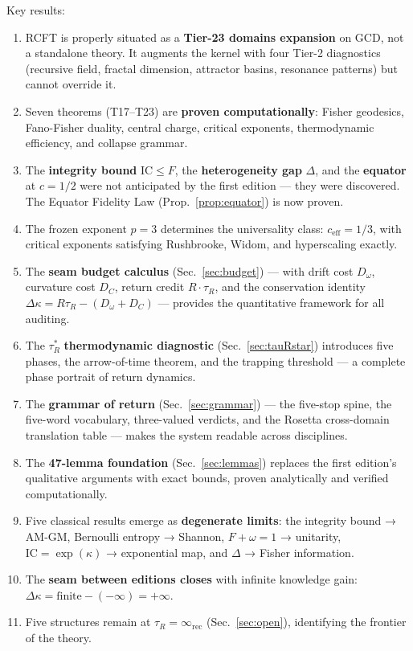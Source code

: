 \documentclass[
  aps,
  prd,
  preprint,
  superscriptaddress,
  nofootinbib,
  floatfix,
  longbibliography
]{revtex4-2}
\newcommand{\tR}{\tau_{\!R}}
\newcommand{\tRstar}{\tau_{\!R}^{*}}
\newcommand{\IC}{\mathrm{IC}}
\newcommand{\Fid}{F}
\newcommand{\Drft}{\omega}
\newcommand{\Curv}{C}
\newcommand{\Logint}{\kappa}
\newcommand{\ceff}{c_{\mathrm{eff}}}
\newcommand{\hetgap}{\Delta}
\begin{document}
Key results:
\begin{enumerate}[nosep,leftmargin=*]
  \item RCFT is properly situated as a \textbf{Tier-23 domains
    expansion} on GCD, not a standalone theory. It augments
    the kernel with four Tier-2 diagnostics
    (recursive field, fractal dimension, attractor basins,
    resonance patterns) but cannot override it.
  \item Seven theorems (T17–T23) are \textbf{proven
    computationally}: Fisher geodesics, Fano-Fisher duality,
    central charge, critical exponents, thermodynamic
    efficiency, and collapse grammar.
  \item The \textbf{integrity bound} $\IC \leq \Fid$, the
    \textbf{heterogeneity gap} $\hetgap$, and the
    \textbf{equator} at $c = 1/2$ were not anticipated
    by the first edition — they were discovered.
    The Equator Fidelity Law (Prop.~\ref{prop:equator})
    is now proven.
  \item The frozen exponent $p = 3$ determines the universality
    class: $\ceff = 1/3$, with critical exponents satisfying
    Rushbrooke, Widom, and hyperscaling exactly.
  \item The \textbf{seam budget calculus}
    (Sec.~\ref{sec:budget}) — with drift cost $D_\Drft$,
    curvature cost $D_\Curv$, return credit $R \cdot \tR$,
    and the conservation identity
    $\Delta\Logint = R\tR - (D_\Drft + D_\Curv)$ —
    provides the quantitative framework for all auditing.
  \item The $\tRstar$ \textbf{thermodynamic diagnostic}
    (Sec.~\ref{sec:tauRstar}) introduces five phases, the
    arrow-of-time theorem, and the trapping threshold
    — a complete phase portrait of return dynamics.
  \item The \textbf{grammar of return}
    (Sec.~\ref{sec:grammar}) — the five-stop spine,
    the five-word vocabulary, three-valued verdicts,
    and the Rosetta cross-domain translation table —
    makes the system readable across disciplines.
  \item The \textbf{47-lemma foundation}
    (Sec.~\ref{sec:lemmas}) replaces the first edition's
    qualitative arguments with exact bounds, proven
    analytically and verified computationally.
  \item Five classical results emerge as \textbf{degenerate
    limits}: the integrity bound → AM-GM, Bernoulli entropy →
    Shannon, $\Fid + \Drft = 1$ → unitarity,
    $\IC = \exp(\Logint)$ → exponential map,
    and $\hetgap$ → Fisher information.
  \item The \textbf{seam between editions closes} with infinite
    knowledge gain:
    $\Delta\Logint = \mathrm{finite} - (-\infty) = +\infty$.
  \item Five structures remain at
    $\tR = \infty_{\mathrm{rec}}$ (Sec.~\ref{sec:open}),
    identifying the frontier of the theory.
\end{enumerate}
\end{document}
